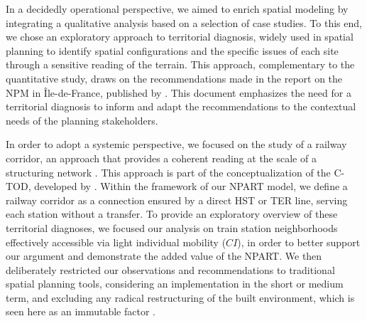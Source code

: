 \begin{refsegment}
In a decidedly operational perspective, we aimed to enrich spatial modeling by integrating a qualitative analysis based on a selection of case studies. To this end, we chose an exploratory approach to territorial diagnosis, widely used in spatial planning to identify spatial configurations and the specific issues of each site through a sensitive reading of the terrain. This approach, complementary to the quantitative study, draws on the recommendations made in the report on the \acrshort{NPM} in Île-de-France, published by \textcolor{blue}{\textcite[5]{iau_articulation_2017}}. This document emphasizes the need for a territorial diagnosis to inform and adapt the recommendations to the contextual needs of the planning stakeholders.%

In order to adopt a systemic perspective, we focused on the study of a railway corridor, an approach that provides a coherent reading at the scale of a structuring network \textcolor{blue}{\autocite{bairras_slow_2025}}. This approach is part of the conceptualization of the \acrfull{C-TOD}, developed by \textcolor{blue}{\textcite[17]{liu_conceptual_2020}}. Within the framework of our \acrshort{NPART} model, we define a railway corridor as a connection ensured by a direct \acrshort{HST} or \acrshort{TER} line, serving each station without a transfer. To provide an exploratory overview of these territorial diagnoses, we focused our analysis on train station neighborhoods effectively accessible via light individual mobility (\(CI\)), in order to better support our argument and demonstrate the added value of the \acrshort{NPART}. We then deliberately restricted our observations and recommendations to traditional spatial planning tools, considering an implementation in the short or medium term, and excluding any radical restructuring of the built environment, which is seen here as an immutable factor \textcolor{blue}{\autocite[45]{stransky_periurbain_2019}}.%


\end{refsegment}
